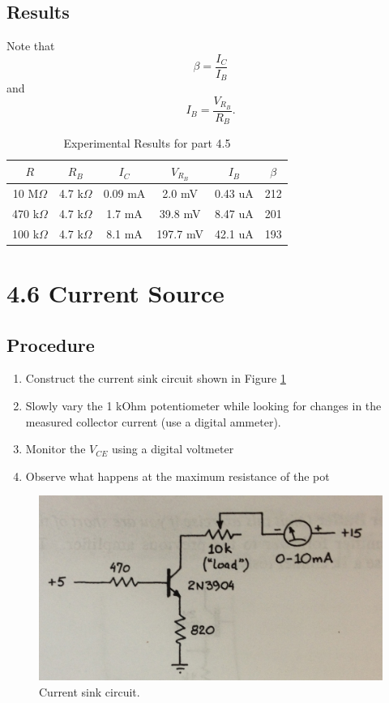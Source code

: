 \documentclass[12pt,letterpaper]{report}
\newlength \figwidth
\begin{document}
\subsection*{Results}
Note that 
$$
\beta = \frac{I_C}{I_B}
$$
and
$$
I_B = \frac{V_{R_B}}{R_B}.
$$

\begin{table}[ht]
\caption{Experimental Results for part 4.5} %
\centering 
    \begin{tabular}{| c | c | c | c | c | c |}
    \hline  
    $R$ & $R_B$ & $I_C$ & $V_{R_B}$ & $I_B$ & $\beta$\\
    \hline
    10 M$\Omega$  & 4.7 k$\Omega$ & 0.09 mA & 2.0 mV  & 0.43 uA & 212 \\
    470 k$\Omega$ & 4.7 k$\Omega$ & 1.7 mA & 39.8 mV  & 8.47 uA & 201 \\
    100 k$\Omega$ & 4.7 k$\Omega$ & 8.1 mA & 197.7 mV & 42.1 uA & 193 \\
    \hline
    \end{tabular}
    \label{table:4_5_results}
\end{table}

\section*{4.6 Current Source}
\subsection*{Procedure}

\begin{enumerate}
\item Construct the current sink circuit shown in Figure \ref{fig:4.6_circuit}
\item Slowly vary the 1 kOhm potentiometer while looking for changes in the measured collector current (use a digital ammeter).
\item Monitor the $V_{CE}$ using a digital voltmeter
\item Observe what happens at the maximum resistance of the pot
\end{enumerate}

\begin{figure}[H]
\centering
\includegraphics[width=\figwidth, keepaspectratio=true]{lab5/circuit.jpg}
\caption{Current sink circuit.}
\label{fig:4.6_circuit}
\end{figure}
\end{document}
